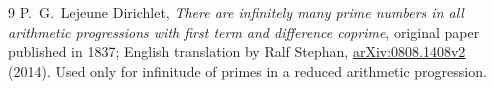 \documentclass[11pt,letterpaper]{article}
\numberwithin{equation}{section}
\theoremstyle{definition}
\theoremstyle{remark}
\begin{document}
\begin{thebibliography}{9}
P.~G.~Lejeune Dirichlet,
\emph{There are infinitely many prime numbers in all arithmetic progressions with first term and difference coprime},
original paper published in 1837; English translation by Ralf Stephan,
\href{https://arxiv.org/abs/0808.1408v2}{arXiv:0808.1408v2} (2014).
Used only for infinitude of primes in a reduced arithmetic progression.

\end{thebibliography}
\endgroup
\end{document}
